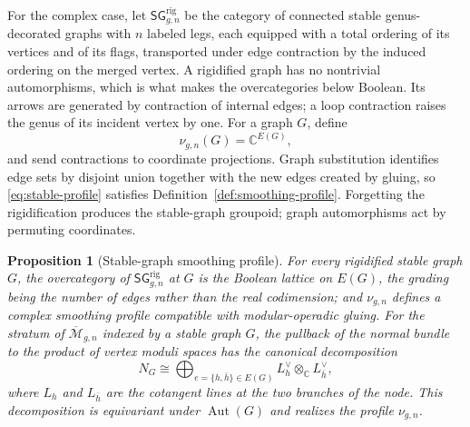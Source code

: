 \documentclass[11pt,letterpaper,twoside]{article}
\theoremstyle{plain}
\newtheorem{proposition}[theorem]{Proposition}
\theoremstyle{definition}
\theoremstyle{remark}
\begin{document}
For the complex case, let \(\mathsf{SG}^{\mathrm{rig}}_{g,n}\) be the category of connected stable genus-decorated graphs with \(n\) labeled legs, each equipped with a total ordering of its vertices and of its flags, transported under edge contraction by the induced ordering on the merged vertex.  A rigidified graph has no nontrivial automorphisms, which is what makes the overcategories below Boolean.  Its arrows are generated by contraction of internal edges; a loop contraction raises the genus of its incident vertex by one.  For a graph \(G\), define
\begin{equation}\label{eq:stable-profile}
 \nu_{g,n}(G)=\mathbb C^{E(G)},
\end{equation}
and send contractions to coordinate projections.  Graph substitution identifies edge sets by disjoint union together with the new edges created by gluing, so \eqref{eq:stable-profile} satisfies Definition~\ref{def:smoothing-profile}.  Forgetting the rigidification produces the stable-graph groupoid; graph automorphisms act by permuting coordinates.

\begin{proposition}[Stable-graph smoothing profile]\label{prop:stable-graphs}
For every rigidified stable graph \(G\), the overcategory of \(\mathsf{SG}^{\mathrm{rig}}_{g,n}\) at \(G\) is the Boolean lattice on \(E(G)\), the grading being the number of edges rather than the real codimension; and \(\nu_{g,n}\) defines a complex smoothing profile compatible with modular-operadic gluing.  For the stratum of \(\overline{\mathcal M}_{g,n}\) indexed by a stable graph \(G\), the pullback of the normal bundle to the product of vertex moduli spaces has the canonical decomposition
\begin{equation}\label{eq:stable-normal}
 N_G\cong\bigoplus_{e=\{h,\bar h\}\in E(G)}
 L_h^\vee\otimes_{\mathbb C}L_{\bar h}^\vee,
\end{equation}
where \(L_h\) and \(L_{\bar h}\) are the cotangent lines at the two branches of the node.  This decomposition is equivariant under \(\operatorname{Aut}(G)\) and realizes the profile \(\nu_{g,n}\).
\end{proposition}
\end{document}
